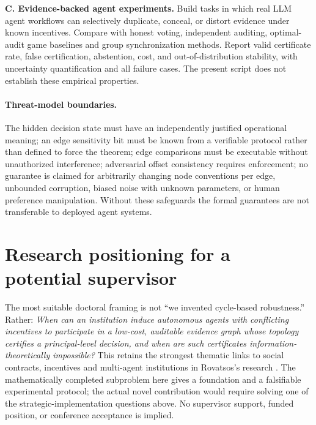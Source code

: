\documentclass[10pt,a4paper]{article}
\theoremstyle{definition}\newtheorem{definition}[theorem]{Definition}
\begin{document}
\textbf{C. Evidence-backed agent experiments.} Build tasks in which real LLM agent workflows can selectively duplicate, conceal, or distort evidence under known incentives. Compare with honest voting, independent auditing, optimal-audit game baselines and group synchronization methods. Report valid certificate rate, false certification, abstention, cost, and out-of-distribution stability, with uncertainty quantification and all failure cases. The present script does not establish these empirical properties.

\paragraph{Threat-model boundaries.} The hidden decision state must have an independently justified operational meaning; an edge sensitivity bit must be known from a verifiable protocol rather than defined to force the theorem; edge comparisons must be executable without unauthorized interference; adversarial offset consistency requires enforcement; no guarantee is claimed for arbitrarily changing node conventions per edge, unbounded corruption, biased noise with unknown parameters, or human preference manipulation. Without these safeguards the formal guarantees are not transferable to deployed agent systems.

\section{Research positioning for a potential supervisor}
The most suitable doctoral framing is not ``we invented cycle-based robustness.'' Rather: \emph{When can an institution induce autonomous agents with conflicting incentives to participate in a low-cost, auditable evidence graph whose topology certifies a principal-level decision, and when are such certificates information-theoretically impossible?} This retains the strongest thematic links to social contracts, incentives and multi-agent institutions in Rovatsos's research \cite{davoust2020}. The mathematically completed subproblem here gives a foundation and a falsifiable experimental protocol; the actual novel contribution would require solving one of the strategic-implementation questions above. No supervisor support, funded position, or conference acceptance is implied.
\end{document}
